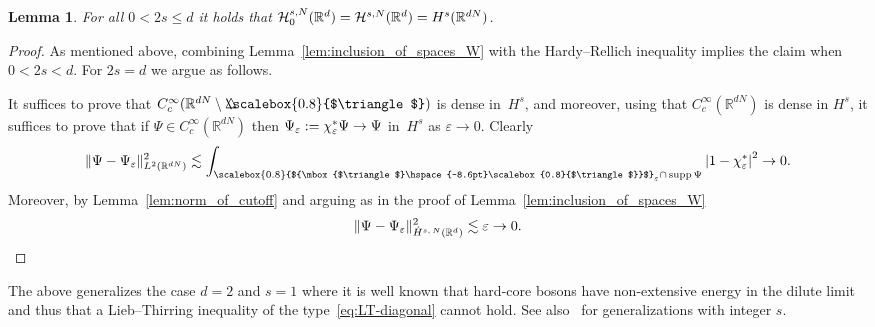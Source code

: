 \documentclass[10pt]{amsart}
\newtheorem{lemm}[theo]{Lemma}\newtheorem{prop}[theo]{Proposition}\newtheorem{coro}[theo]{Corollary}\newtheorem{conj}[theo]{Conjecture}
\theoremstyle{definition}\newtheorem{defi}[theo]{Definition}\newtheorem{rema}[theo]{Remark}\newtheorem{exam}[theo]{Example}\newtheorem{exem}[theo]{Example}\newtheorem{nota}[theo]{Notation}
\newcommand*\eps{\varepsilon}
\newcommand*\R {\mathbb{R}}
\newcommand\1{{\ensuremath {\mathds 1} }}
\newcommand{\cH}{\mathcal{H}}
\DeclareMathOperator{\supp}{supp}
\newcommand{\bDelta}{{\mbox{$\triangle$}\hspace{-8.6pt}\scalebox{0.8}{$\triangle$}}}
\newcommand{\scriptbDelta}{\scalebox{0.8}{$\bDelta$}}
\begin{document}
\begin{lemm}\label{lem:inclusion_of_spaces_0}
For all $0 < 2s \le d$ it holds that $\cH^{s,N}_0(\R^d) = \cH^{s,N}(\R^d)\linebreak= H^s(\R^{dN})$.
\end{lemm}
\begin{proof}
As mentioned above, combining Lemma~\ref{lem:inclusion_of_spaces_W} with the Hardy--Rellich inequality implies the claim when $0<2s<d$. For $2s=d$ we argue as follows.

It suffices to prove that $C_c^\infty(\R^{dN} \setminus \bDelta)$ is dense in~$H^s$, and moreover, using that $C_c^\infty(\R^{dN})$ is dense in $H^s$, it suffices to prove that if $\Psi \in C_c^\infty(\R^{dN})$ then $\Psi_\eps := \chi^*_\eps\Psi\linebreak\to \Psi$ in~$H^s$ as $\eps\to 0$. Clearly
\[
\|\Psi-\Psi_\eps\|_{L^2(\R^{dN})}^2
\lesssim \int_{\scriptbDelta_\eps \cap\, \supp \Psi} \left|1-\chi^*_\eps\right|^2 \to 0.
\]
Moreover, by Lemma~\ref{lem:norm_of_cutoff} and arguing as in the proof of Lemma~\ref{lem:inclusion_of_spaces_W}
\begin{equation*}
\|\Psi-\Psi_\eps\|_{\dot{H}^{s,\,N}(\R^{d})}^2
\lesssim \eps \to 0.\qedhere
\end{equation*}
\end{proof}


The above generalizes the case $d=2$ and $s=1$ where it is well known that hard-core bosons have non-extensive energy in the dilute limit~\cite{LieYng-01} and thus that a Lieb--Thirring inequality of the type~\eqref{eq:LT-diagonal} cannot hold. See also~\cite{Svendsen-81} for generalizations with integer $s$.
\end{document}
